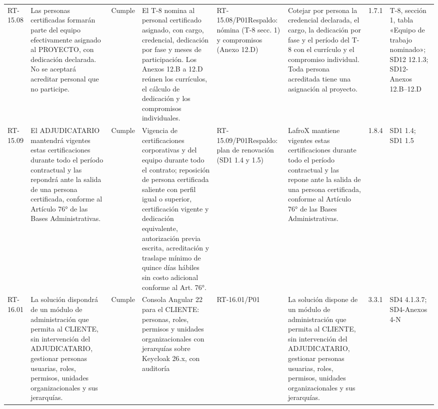 \documentclass[oficio,firma,final]{lafrox}
\begin{document}
\begin{landscape}
{\begin{longtable}{@{}F{0.054} F{0.173} F{0.061} F{0.191} F{0.106} F{0.180} F{0.067} F{0.168}@{}}
  RT-15.08 & Las personas certificadas formarán parte del equipo efectivamente asignado al PROYECTO, con dedicación declarada. No se aceptará acreditar personal que no participe. & Cumple & El T-8 nomina al personal certificado asignado, con cargo, credencial, dedicación por fase y meses de participación. Los Anexos 12.B a 12.D reúnen los currículos, el cálculo de dedicación y los compromisos individuales. & RT-15.08/\allowbreak{}P01\newline Respaldo: nómina (T-8 secc. 1) y compromisos (Anexo 12.D) & Cotejar por persona la credencial declarada, el cargo, la dedicación por fase y el período del T-8 con el currículo y el compromiso individual. Toda persona acreditada tiene una asignación al proyecto. & 1.7.1 & T-8, sección 1, tabla «Equipo de trabajo nominado»; SD12 12.1.3; SD12-Anexos 12.B--12.D  \\
  RT-15.09 & El ADJUDICATARIO mantendrá vigentes estas certificaciones durante todo el período contractual y las repondrá ante la salida de una persona certificada, conforme al Artículo 76° de las Bases Administrativas. & Cumple & Vigencia de certificaciones corporativas y del equipo durante todo el contrato; reposición de persona certificada saliente con perfil igual o superior, certificación vigente y dedicación equivalente, autorización previa escrita, acreditación y traslape mínimo de quince días hábiles sin costo adicional conforme al Art. 76°. & RT-15.09/\allowbreak{}P01\newline Respaldo: plan de renovación (SD1 1.4 y 1.5) & LafroX mantiene vigentes estas certificaciones durante todo el período contractual y las repone ante la salida de una persona certificada, conforme al Artículo 76° de las Bases Administrativas. & 1.8.4 & SD1 1.4; SD1 1.5  \\
  RT-16.01 & La solución dispondrá de un módulo de administración que permita al CLIENTE, sin intervención del ADJUDICATARIO, gestionar personas usuarias, roles, permisos, unidades organizacionales y sus jerarquías. & Cumple & Consola Angular 22 para el CLIENTE: personas, roles, permisos y unidades organizacionales con jerarquías sobre Keycloak 26.x, con auditoría & RT-16.01/\allowbreak{}P01 & La solución dispone de un módulo de administración que permita al CLIENTE, sin intervención del ADJUDICATARIO, gestionar personas usuarias, roles, permisos, unidades organizacionales y sus jerarquías. & 3.3.1 & SD4 4.1.3.7; SD4-Anexos 4-N  \\

\end{longtable}}
\end{landscape}
\end{document}

